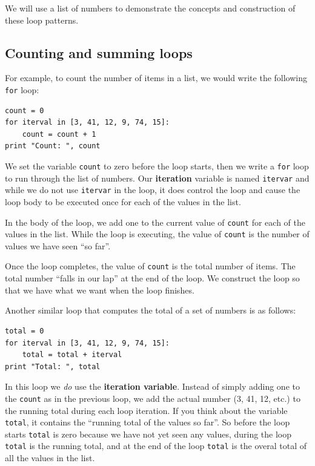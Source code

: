 \documentclass[10pt]{book}
\begin{document}
We will use a list of numbers to demonstrate the concepts and construction
of these loop patterns.  

\subsection{Counting and summing loops}

For example, to count the number of items
in a list, we would write the following {\tt for} loop:

\beforeverb
\begin{verbatim}
count = 0
for iterval in [3, 41, 12, 9, 74, 15]:
    count = count + 1
print "Count: ", count
\end{verbatim}
\afterverb
%
We set the variable {\tt count} to zero before the loop starts,
then we write a {\tt for} loop to run through the list of numbers.
Our {\bf iteration} variable is named {\tt itervar} and while we do
not use {\tt itervar} in the loop, it does control the loop and cause
the loop body to be executed once for each of the values in the list.

In the body of the loop, we add one to the current value of {\tt count}
for each of the values in the list.  While the loop is executing, the 
value of {\tt count} is the number of values we have seen ``so far''.

Once the loop completes, the value of {\tt count} is the total number
of items.   The total number ``falls in our lap'' at the end of the 
loop.  We construct the loop so that we have what we want when the loop
finishes.

Another similar loop that computes the total of a set of numbers
is as follows:

\beforeverb
\begin{verbatim}
total = 0
for iterval in [3, 41, 12, 9, 74, 15]:
    total = total + iterval
print "Total: ", total
\end{verbatim}
\afterverb
%
In this loop we {\em do} use the {\bf iteration variable}.
Instead of simply adding one to the {\tt count} as in the previous loop, 
we add the actual number (3, 41, 12, etc.) to the running 
total during each loop iteration.
If you think about the variable {\tt total}, it contains the 
``running total of the values so far''.  So before the loop
starts {\tt total} is zero because we have not yet seen any values,
during the loop {\tt total} is the running total, and at the end of 
the loop {\tt total} is the overal total of all the values 
in the list.
\end{document}
